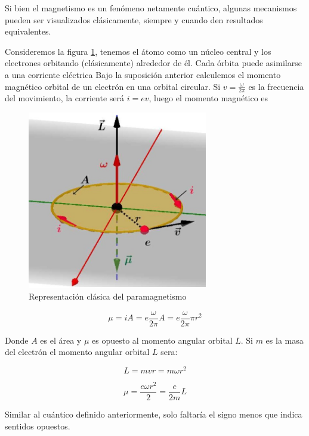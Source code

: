 Si bien el magnetismo es un fenómeno netamente cuántico, algunas mecanismos pueden ser visualizados clásicamente, siempre y cuando den resultados equivalentes.

Consideremos la figura \ref{fig:s7}, tenemos el átomo como un núcleo central y los electrones orbitando (clásicamente) alrededor de él. Cada órbita puede asimilarse a una corriente eléctrica Bajo la suposición anterior calculemos el momento magnético orbital de un electrón en una orbital circular. Si $v=\frac{\omega}{2\pi}$ es la frecuencia del movimiento, la corriente será $i=ev$, luego el momento magnético es

\begin{figure}[H]
    \centering
    \includegraphics[width=0.7\textwidth]{./Figures/fig_s7}
	\caption{Representación clásica del paramagnetismo}
	\label{fig:s7}
\end{figure}


\begin{equation}
  \mu= iA = e \frac{\omega}{2\pi}A = e \frac{\omega}{2\pi} \pi r^{2}
\end{equation}

Donde $A$ es el área y $\mu$ es opuesto al momento angular orbital $L$. Si $m$ es la masa del electrón el momento angular orbital $L$ sera:

\begin{equation}
  L=mvr=m\omega r^{2}
\end{equation}


\begin{equation}
  \mu=\frac{e\omega r^{2}}{2}=\frac{e}{2m}L
\end{equation}

Similar al cuántico definido anteriormente, solo faltaría el signo menos que indica sentidos opuestos.

